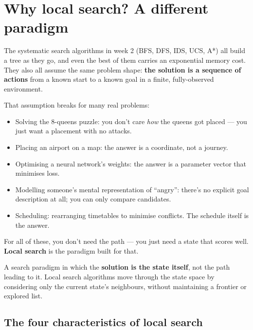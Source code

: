 \documentclass[11pt, a4paper]{article}
\begin{document}
\section{Why local search? A different paradigm}

The systematic search algorithms in week 2 (BFS, DFS, IDS, UCS, A*) all build a tree as they go, and even the best of them carries an exponential memory cost. They also all assume the same problem shape: \textbf{the solution is a sequence of actions} from a known start to a known goal in a finite, fully-observed environment.

That assumption breaks for many real problems:

\begin{itemize}
  \item Solving the 8-queens puzzle: you don't care \emph{how} the queens got placed — you just want a placement with no attacks.
  \item Placing an airport on a map: the answer is a coordinate, not a journey.
  \item Optimising a neural network's weights: the answer is a parameter vector that minimises loss.
  \item Modelling someone's mental representation of ``angry'': there's no explicit goal description at all; you can only compare candidates.
  \item Scheduling: rearranging timetables to minimise conflicts. The schedule itself is the answer.
\end{itemize}

For all of these, you don't need the path — you just need a state that scores well. \textbf{Local search} is the paradigm built for that.

\begin{defbox}
A search paradigm in which the \textbf{solution is the state itself}, not the path leading to it. Local search algorithms move through the state space by considering only the current state's neighbours, without maintaining a frontier or explored list.
\end{defbox}

\subsection{The four characteristics of local search}
\end{document}
